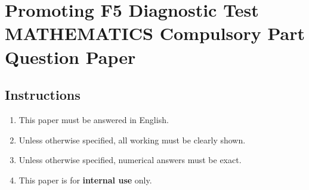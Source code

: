 \documentclass[11pt]{article}
\begin{document}
    \thispagestyle{plain}

    \centering 

    \section*{Promoting F5 Diagnostic Test\\MATHEMATICS Compulsory Part\\Question Paper}

    \raggedright

    \subsection*{Instructions}

    \begin{enumerate}
        \item This paper must be answered in English.
        \item Unless otherwise specified, all working must be clearly shown.
        \item Unless otherwise specified, numerical answers must be exact.
        \item This paper is for \textbf{internal use} only.
    \end{enumerate}

    \newpage
\end{document}
